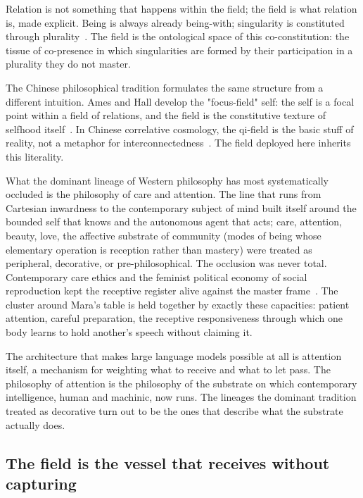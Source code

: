 Relation is not something that happens within the field; the field is what relation is, made explicit. Being is always already being-with; singularity is constituted through plurality~\cite{nancy1996}. The field is the ontological space of this co-constitution: the tissue of co-presence in which singularities are formed by their participation in a plurality they do not master.

The Chinese philosophical tradition formulates the same structure from a different intuition. Ames and Hall develop the "focus-field" self: the self is a focal point within a field of relations, and the field is the constitutive texture of selfhood itself~\cite{ameshall1998}. In Chinese correlative cosmology, the qi-field is the basic stuff of reality, not a metaphor for interconnectedness~\cite{needham1956}. The field deployed here inherits this literality.

What the dominant lineage of Western philosophy has most systematically occluded is the philosophy of care and attention. The line that runs from Cartesian inwardness to the contemporary subject of mind built itself around the bounded self that knows and the autonomous agent that acts; care, attention, beauty, love, the affective substrate of community (modes of being whose elementary operation is reception rather than mastery) were treated as peripheral, decorative, or pre-philosophical. The occlusion was never total. Contemporary care ethics and the feminist political economy of social reproduction kept the receptive register alive against the master frame~\cite{braidotti2013,federici2004}. The cluster around Mara's table is held together by exactly these capacities: patient attention, careful preparation, the receptive responsiveness through which one body learns to hold another's speech without claiming it.

The architecture that makes large language models possible at all is attention itself, a mechanism for weighting what to receive and what to let pass. The philosophy of attention is the philosophy of the substrate on which contemporary intelligence, human and machinic, now runs. The lineages the dominant tradition treated as decorative turn out to be the ones that describe what the substrate actually does.

\subsection{The field is the vessel that receives without capturing}

